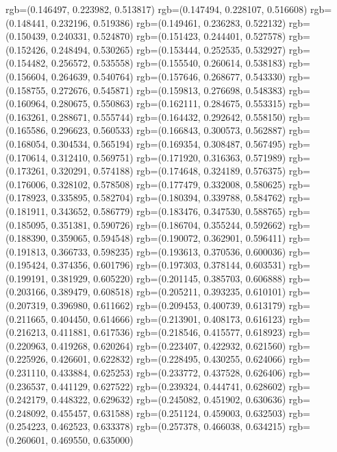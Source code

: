 {{{					rgb=(0.146497, 0.223982, 0.513817)
					rgb=(0.147494, 0.228107, 0.516608)
					rgb=(0.148441, 0.232196, 0.519386)
					rgb=(0.149461, 0.236283, 0.522132)
					rgb=(0.150439, 0.240331, 0.524870)
					rgb=(0.151423, 0.244401, 0.527578)
					rgb=(0.152426, 0.248494, 0.530265)
					rgb=(0.153444, 0.252535, 0.532927)
					rgb=(0.154482, 0.256572, 0.535558)
					rgb=(0.155540, 0.260614, 0.538183)
					rgb=(0.156604, 0.264639, 0.540764)
					rgb=(0.157646, 0.268677, 0.543330)
					rgb=(0.158755, 0.272676, 0.545871)
					rgb=(0.159813, 0.276698, 0.548383)
					rgb=(0.160964, 0.280675, 0.550863)
					rgb=(0.162111, 0.284675, 0.553315)
					rgb=(0.163261, 0.288671, 0.555744)
					rgb=(0.164432, 0.292642, 0.558150)
					rgb=(0.165586, 0.296623, 0.560533)
					rgb=(0.166843, 0.300573, 0.562887)
					rgb=(0.168054, 0.304534, 0.565194)
					rgb=(0.169354, 0.308487, 0.567495)
					rgb=(0.170614, 0.312410, 0.569751)
					rgb=(0.171920, 0.316363, 0.571989)
					rgb=(0.173261, 0.320291, 0.574188)
					rgb=(0.174648, 0.324189, 0.576375)
					rgb=(0.176006, 0.328102, 0.578508)
					rgb=(0.177479, 0.332008, 0.580625)
					rgb=(0.178923, 0.335895, 0.582704)
					rgb=(0.180394, 0.339788, 0.584762)
					rgb=(0.181911, 0.343652, 0.586779)
					rgb=(0.183476, 0.347530, 0.588765)
					rgb=(0.185095, 0.351381, 0.590726)
					rgb=(0.186704, 0.355244, 0.592662)
					rgb=(0.188390, 0.359065, 0.594548)
					rgb=(0.190072, 0.362901, 0.596411)
					rgb=(0.191813, 0.366733, 0.598235)
					rgb=(0.193613, 0.370536, 0.600036)
					rgb=(0.195424, 0.374356, 0.601796)
					rgb=(0.197303, 0.378144, 0.603531)
					rgb=(0.199191, 0.381929, 0.605220)
					rgb=(0.201145, 0.385703, 0.606888)
					rgb=(0.203166, 0.389479, 0.608518)
					rgb=(0.205211, 0.393235, 0.610101)
					rgb=(0.207319, 0.396980, 0.611662)
					rgb=(0.209453, 0.400739, 0.613179)
					rgb=(0.211665, 0.404450, 0.614666)
					rgb=(0.213901, 0.408173, 0.616123)
					rgb=(0.216213, 0.411881, 0.617536)
					rgb=(0.218546, 0.415577, 0.618923)
					rgb=(0.220963, 0.419268, 0.620264)
					rgb=(0.223407, 0.422932, 0.621560)
					rgb=(0.225926, 0.426601, 0.622832)
					rgb=(0.228495, 0.430255, 0.624066)
					rgb=(0.231110, 0.433884, 0.625253)
					rgb=(0.233772, 0.437528, 0.626406)
					rgb=(0.236537, 0.441129, 0.627522)
					rgb=(0.239324, 0.444741, 0.628602)
					rgb=(0.242179, 0.448322, 0.629632)
					rgb=(0.245082, 0.451902, 0.630636)
					rgb=(0.248092, 0.455457, 0.631588)
					rgb=(0.251124, 0.459003, 0.632503)
					rgb=(0.254223, 0.462523, 0.633378)
					rgb=(0.257378, 0.466038, 0.634215)
					rgb=(0.260601, 0.469550, 0.635000)
}}}
